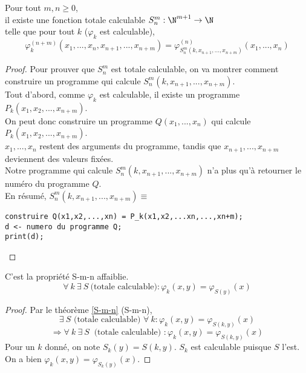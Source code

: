 \begin{mytheo}[S-m-n]
	\label{S-m-n}Pour tout $m,n \geq 0$, \\
	il existe une fonction totale calculable $S^m_n : \N^{m+1} \rightarrow
	\N$ \\
	telle que pour tout $k$ ($\varphi_k$ est calculable),
	$$ \varphi^{(n+m)}_k(x_1,...,x_n,x_{n+1},...,x_{n+m}) =
	\varphi^{(n)}_{S^m_n(k,x_{n+1}, ...,x_{n+m})} (x_1,...,x_n)$$
\end{mytheo}

\begin{proof}
	Pour prouver que $S^m_n$ est totale calculable, on va montrer comment construire un programme qui
	calcule  $S^m_n(k,x_{n+1}, ...,x_{n+m})$.\\
	Tout d'abord, comme $\varphi_k$ est calculable, il existe un programme
	$P_k(x_1,x_2,...,x_{n+m})$.\\
	On peut donc construire un programme $Q(x_1,...,x_n)$ qui calcule
	$P_k(x_1,x_2,...,x_{n+m})$.\\
	$x_1,...,x_n$ restent des arguments du programme,
	tandis que $x_{n+1},...,x_{n+m}$ deviennent des valeurs fixées.\\
	Notre programme qui calcule $S^m_n(k,x_{n+1}, ...,x_{n+m})$ n'a plus
	qu'à retourner le numéro du programme $Q$.\\
       	En résumé, $S^m_n(k,x_{n+1},
	...,x_{n+m}) \equiv$
	\begin{lstlisting}
construire Q(x1,x2,...,xn) = P_k(x1,x2,...xn,...,xn+m);
d <- numero du programme Q;
print(d);
	\end{lstlisting}
\end{proof}

\begin{mytheo}[S]
	C'est la propriété S-m-n affaiblie.
	\[ \forall \ k \ \exists \ S \ \text{(totale calculable)} : \varphi_k(x,y)=\varphi_{S(y)}(x)\]
\end{mytheo}

\begin{proof}
Par le théorème \ref{S-m-n} (S-m-n),
	\[ \exists \ S \text{ (totale calculable) } \forall \ k : \varphi_k(x,y)=\varphi_{S(k,y)}(x)\]
	\[\Rightarrow \forall \ k \ \exists \ S \ \text{ (totale calculable) } : \varphi_k(x,y)=\varphi_{S(k,y)}(x)\]
    Pour un $k$ donné, on note $S_k(y)=S(k,y)$. $S_k$ est calculable puisque $S$ l'est. On a bien $\varphi_k(x,y) = \varphi_{S_k(y)}(x)$.
\end{proof}

